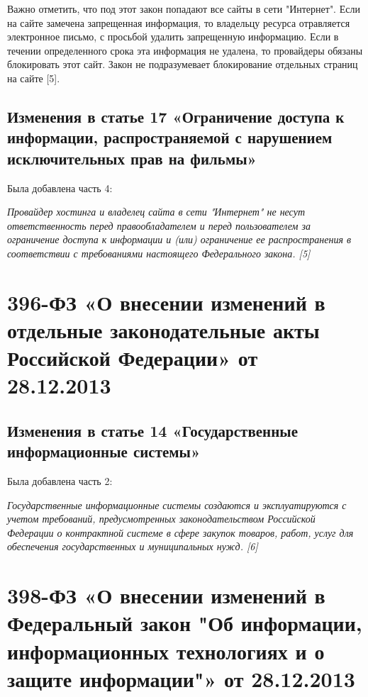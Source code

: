 \documentclass[14pt,a4paper,report]{article}
\begin{document}
Важно отметить, что под этот закон попадают все сайты в сети "Интернет". Если на сайте замечена запрещенная информация, то владельцу ресурса отравляется электронное письмо, с просьбой удалить запрещенную информацию. Если в течении определенного срока эта информация не удалена, то провайдеры обязаны блокировать этот сайт. Закон не подразумевает блокирование отдельных страниц на сайте [5].

\subsection{Изменения в статье 17 «Ограничение доступа к информации, распространяемой с нарушением исключительных прав на фильмы»}

Была добавлена часть 4:

\begin{displayquote}
	\emph{Провайдер хостинга и владелец сайта в сети "Интернет" не несут ответственность перед правообладателем и перед пользователем за ограничение доступа к информации и (или) ограничение ее распространения в соответствии с требованиями настоящего Федерального закона. [5]}
\end{displayquote}

\section{396-ФЗ «О внесении изменений в отдельные законодательные акты Российской Федерации» от 28.12.2013}

\subsection{Изменения в статье 14 «Государственные информационные системы»}

Была добавлена часть 2:

\begin{displayquote}
	\emph{Государственные информационные системы создаются и эксплуатируются с учетом требований, предусмотренных законодательством Российской Федерации о контрактной системе в сфере закупок товаров, работ, услуг для обеспечения государственных и муниципальных нужд. [6]}
\end{displayquote}

\section{398-ФЗ «О внесении изменений в Федеральный закон "Об информации, информационных технологиях и о защите информации"» от 28.12.2013}
\end{document}

